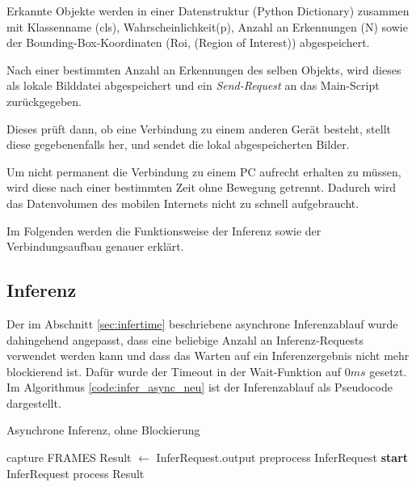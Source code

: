 Erkannte Objekte werden in einer
Datenstruktur (Python Dictionary) zusammen 
mit Klassenname (cls), Wahrscheinlichkeit(p),
Anzahl an Erkennungen (N) sowie der
Bounding-Box-Koordinaten (Roi, (Region of Interest)) 
abgespeichert.


Nach einer bestimmten Anzahl 
an Erkennungen des selben Objekts, wird dieses 
als lokale Bilddatei abgespeichert und ein 
\textit{Send-Request} an das Main-Script zurückgegeben.

Dieses prüft dann, ob eine Verbindung zu einem 
anderen Gerät besteht, stellt diese gegebenenfalls her,
und sendet die lokal abgespeicherten Bilder.

Um nicht permanent die Verbindung zu einem PC aufrecht erhalten 
zu müssen, wird diese nach einer bestimmten Zeit ohne 
Bewegung getrennt. Dadurch wird das Datenvolumen 
des mobilen Internets nicht zu schnell aufgebraucht.

Im Folgenden werden die Funktionsweise der 
Inferenz sowie der Verbindungsaufbau 
genauer erklärt.


\subsection*{Inferenz}

Der im Abschnitt \ref{sec:infertime} beschriebene asynchrone
Inferenzablauf wurde dahingehend angepasst, dass eine beliebige
Anzahl an Inferenz-Requests verwendet werden kann 
und dass das Warten auf ein Inferenzergebnis
nicht mehr blockierend ist.
Dafür wurde der Timeout in der Wait-Funktion auf 
$0ms$ gesetzt.
Im Algorithmus \ref{code:infer_async_neu} ist 
der Inferenzablauf als Pseudocode dargestellt.

\begin{algorithm}[H]
    \caption{Asynchrone Inferenz, ohne Blockierung}
    \label{code:infer_async_neu}
    \begin{algorithmic}
    \WHILE{\TRUE}
    \STATE capture FRAMES
                \STATE Result $\leftarrow$ InferRequest.output
            \ENDIF
                \STATE preprocess InferRequest
                \STATE \textbf{start} InferRequest
            \ENDIF
                \STATE process Result
            \ENDIF
        \ENDFOR
    \ENDWHILE
    \end{algorithmic}
\end{algorithm}    





